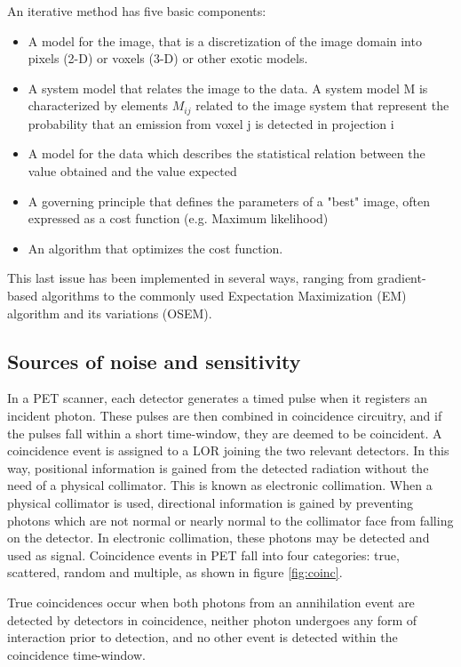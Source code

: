 An iterative method has five basic components:
\begin{itemize}
\item A model for the image, that is a discretization of the image domain into pixels (2-D) or voxels (3-D) or other exotic models.
\item A system model that relates the image to the data. A system model M is characterized by elements $M_{ij}$ related to the image system that represent the probability that an emission from voxel j is detected in projection i
\item A model for the data which describes the statistical relation between the value obtained and the value expected
\item A governing principle that defines the parameters of a "best" image, often expressed as a cost function (e.g. Maximum likelihood)
\item An algorithm that optimizes the cost function.
\end{itemize}

This last issue has been implemented in several ways, ranging from gradient-based algorithms to the commonly used Expectation Maximization (EM) algorithm and its variations (OSEM).

\subsection{Sources of noise and sensitivity}
In a PET scanner, each detector generates a timed pulse when it registers an incident photon. These pulses are then combined in coincidence circuitry, and if the pulses fall within a short time-window, they are deemed to be coincident.
A coincidence event is assigned to a LOR joining the two relevant detectors. In this way, positional information is gained from the detected radiation without the need of a physical collimator. This is known as electronic collimation.
When a physical collimator is used, directional information is gained by preventing photons which are not normal or nearly normal to the collimator face from falling on the detector. In electronic collimation, these photons may be detected and used as signal.
Coincidence events in PET fall into four categories: true, scattered, random and multiple, as shown in figure \ref{fig:coinc}. 

True coincidences occur when both photons from an annihilation event are detected by detectors in coincidence, neither photon undergoes any form of interaction prior to detection, and no other event is detected within the coincidence time-window.

